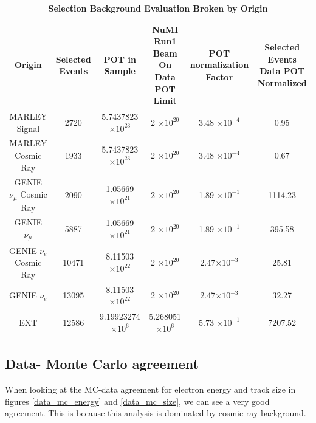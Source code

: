 \begin{table}
    \centering
	\begin{tabular}{cccccc}
		\hline
		\textbf{Origin} & \textbf{Selected Events}	&	\textbf{POT in Sample}	&	\textbf{NuMI Run1 Beam On Data POT Limit} & \textbf{POT normalization Factor} & \textbf{Selected Events Data POT Normalized}\\
		\toprule
		MARLEY Signal & 2720 & 5.7437823 $\times 10^{23}$ & 2 $\times 10^{20}$ & 3.48 $\times 10^{-4}$ & 0.95 \\ 
		MARLEY Cosmic Ray & 1933 & 5.7437823 $\times 10^{23}$ & 2 $\times 10^{20}$ & 3.48 $\times 10^{-4}$ & 0.67 \\
		GENIE  $\nu_{\mu}$ Cosmic Ray &  2090  &  1.05669 $\times 10^{21}$  &  2 $\times 10^{20}$ &  1.89 $\times 10^{-1}$ & 1114.23 \\ 
        GENIE  $\nu_{\mu}$ & 5887 & 1.05669 $\times 10^{21}$ & 2 $\times 10^{20}$ & 1.89 $\times 10^{-1}$ & 395.58 \\
        GENIE  $\nu_{e}$ Cosmic Ray & 10471 & 8.11503 $\times 10^{22}$ & 2 $\times 10^{20}$ & 2.47$\times 10^{-3}$ & 25.81 \\
        GENIE  $\nu_{e}$ & 13095 & 8.11503 $\times 10^{22}$ & 2 $\times 10^{20}$ & 2.47$\times 10^{-3}$ & 32.27 \\
        EXT & 12586 & 9.19923274 $\times 10^{6}$ & 5.268051 $\times 10^{6}$ & 5.73 $\times 10^{-1}$ & 7207.52 \\
		\hline
	\end{tabular}
	\caption[Selection Background Evaluation]{{\textbf{Selection Background Evaluation Broken by Origin}}}
    \label{bkg}
\end{table}

\subsection{Data- Monte Carlo agreement}
When looking at the MC-data agreement for electron energy and track size in figures \ref{data_mc_energy} and \ref{data_mc_size}, we can see a very good agreement. This is because this analysis is dominated by cosmic ray background.

